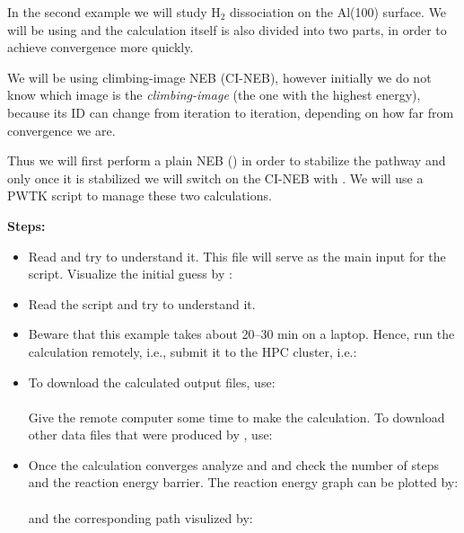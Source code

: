 \documentclass[landscape]{foils}
\begin{document}
In the second example we will study $\mathrm{H_2} $ dissociation on
the Al(100) surface. We will be using  and
the calculation itself is also divided into two parts, in order to
achieve convergence more quickly.

We will be using climbing-image NEB (CI-NEB), however initially we do
not know which image is the {\em climbing-image} (the one with the
highest energy), because its ID can change from iteration to
iteration, depending on how far from convergence we are.

Thus we will first perform a plain NEB () in
order to stabilize the pathway and only once it is stabilized we will
switch on the CI-NEB with . We will use a
PWTK script to manage these two calculations.

{\bf{Steps:}}
\begin{itemize}
\item{Read  and try to understand
    it.
    This file will serve as the main input for the  script. Visualize the initial guess by :\\
    }
\item{Read the  script and try to understand it. }
\item{Beware that this example takes about 20--30 min on a
    laptop. Hence, run the calculation remotely, i.e., submit it to
    the HPC cluster, i.e.:\\
    }
\item To download the calculated output files, use:\\
  \\[0.5em]  
  Give the remote computer some time to make the calculation. To
  download other data files that were produced by , use:\\[0.5em]
\item{Once the calculation converges analyze  and
     and check the number of steps and the reaction
    energy barrier.
    The reaction energy graph can be plotted by:\\
     \\[0.5em]
    and the corresponding path visulized by: \\
     }
\end{itemize}
\end{document}
